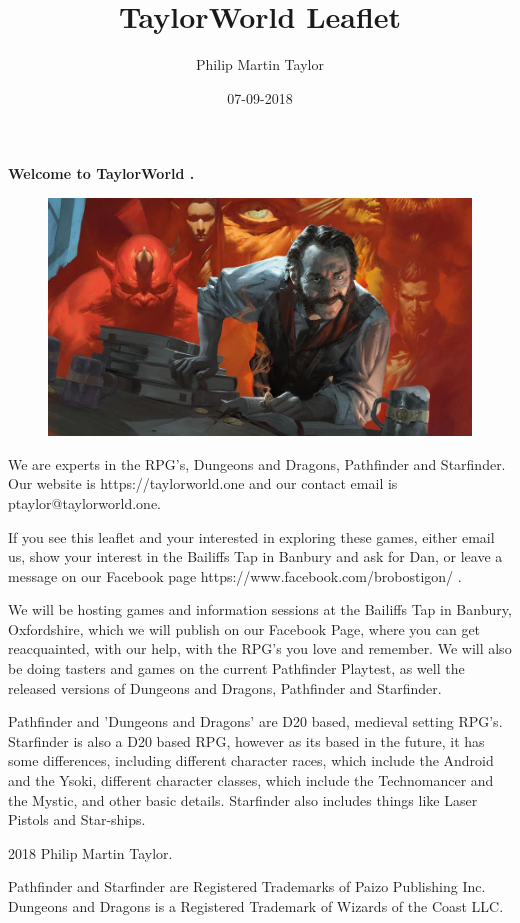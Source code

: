 \documentclass[12pt,a4paper]{book}
\date{07-09-2018}
\author{Philip Martin Taylor}
\title{TaylorWorld Leaflet}
\begin{document}
\begin{center}
\textbf{Welcome to TaylorWorld \texttrademark.}
\end{center}
\begin{figure}[h]
  \centering
  \includegraphics[scale=0.15]{alchemist.jpg}
\end{figure}
\begin{flushleft}
We are experts in the RPG's, Dungeons and Dragons, Pathfinder and Starfinder. Our website is https://taylorworld.one and our contact email is ptaylor@taylorworld.one.
\end{flushleft}
\begin{flushleft}
  If you see this leaflet and your interested in exploring these games, either email us, show your interest in the Bailiffs Tap in Banbury and ask for Dan, or leave a message on our Facebook page https://www.facebook.com/brobostigon/ .
\end{flushleft}
\begin{flushleft}
 We will be hosting games and information sessions at the Bailiffs Tap in Banbury, Oxfordshire, which we will publish on our Facebook Page, where you can get reacquainted, with our help, with the RPG's you love and remember. We will also be doing tasters and games on the current Pathfinder Playtest, as well the released versions of Dungeons and Dragons, Pathfinder and Starfinder.
\end{flushleft}
\begin{flushleft}
  Pathfinder and 'Dungeons and Dragons' are D20 based, medieval setting RPG's. Starfinder is also a D20 based RPG, however as its based in the future, it has some differences, including different character races, which include the Android and the Ysoki, different character classes, which include the Technomancer and the Mystic, and other basic details. Starfinder also includes things like Laser Pistols and Star-ships.
\end{flushleft}
\begin{center}
  \textcopyright{} 2018 Philip Martin Taylor.
\end{center}
\begin{center}
  Pathfinder and Starfinder are Registered Trademarks of Paizo Publishing Inc. Dungeons and Dragons is a Registered Trademark of Wizards of the Coast LLC.
\end{center}
\end{document}
